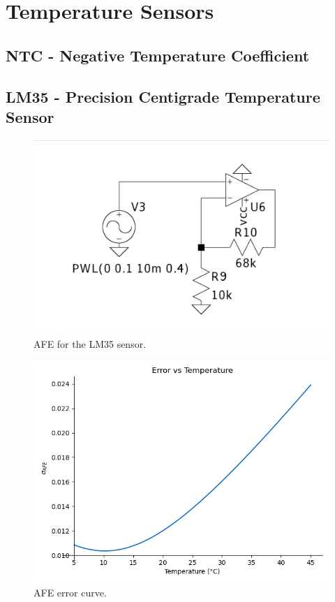 \documentclass[12pt]{article}
\begin{document}
\section{Temperature Sensors}
\subsection{NTC - Negative Temperature Coefficient}

\subsection{LM35 - Precision Centigrade Temperature Sensor}


     \begin{figure}[H] 
        \centering
        \includegraphics*[scale = 0.2]{images/AFELM35.png}
        \caption{AFE for the LM35 sensor.}
        \label{wrap-fig:1}
    \end{figure}

   \begin{figure}[H] 
        \centering
        \includegraphics*[scale = 0.5]{images/ErroTempLm35AFE.png}
        \caption{AFE error curve.}
        \label{wrap-fig:1}
    \end{figure}
\end{document}
